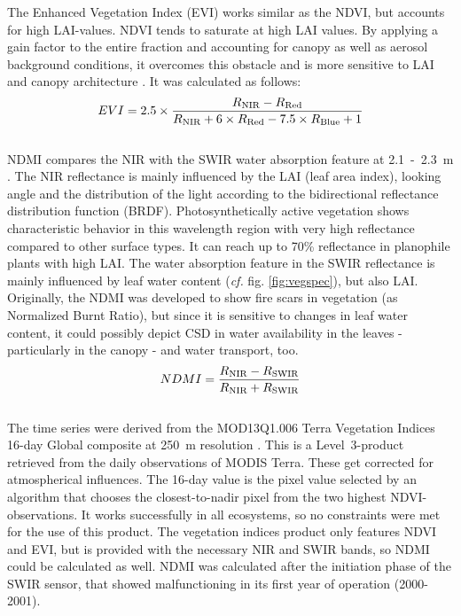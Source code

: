 The Enhanced Vegetation Index (EVI) works similar as the NDVI, but accounts for high LAI-values. NDVI tends to saturate at high LAI values. By applying a gain factor to the entire fraction and accounting for canopy as well as aerosol background conditions, it overcomes this obstacle and is more sensitive to LAI and canopy architecture \citep{liu1995}. It was calculated as follows:\\
\begin{equation}\label{eq:evi}
	EVI = 2.5 \times \frac{R\textsubscript{NIR} - R\textsubscript{Red}}{R\textsubscript{NIR} + 6 \times R\textsubscript{Red} - 7.5 \times R\textsubscript{Blue} + 1}
\end{equation}\\

NDMI compares the NIR with the SWIR water absorption feature at 2.1~-~2.3~\textmu m \citep[\textit{cf.} formula \ref{eq:nbr}, after][]{garcia1991}. The NIR reflectance is mainly influenced by the LAI (leaf area index), looking angle and the distribution of the light according to the bidirectional reflectance distribution function (BRDF). Photosynthetically active vegetation shows characteristic behavior in this wavelength region with very high reflectance compared to other surface types. It can reach up to 70\% reflectance in planophile plants with high LAI. The water absorption feature in the SWIR reflectance is mainly influenced by leaf water content (\textit{cf.} fig. \ref{fig:vegspec}), but also LAI. Originally, the NDMI was developed to show fire scars in vegetation (as Normalized Burnt Ratio), but since it is sensitive to changes in leaf water content, it could possibly depict CSD in water availability in the leaves - particularly in the canopy - and water transport, too.\\

\begin{equation}\label{eq:nbr}
	NDMI = \frac{R\textsubscript{NIR} - R\textsubscript{SWIR}}{R\textsubscript{NIR} + R\textsubscript{SWIR}} 
\end{equation}\\

The time series were derived from the MOD13Q1.006 Terra Vegetation Indices 16-day Global composite at 250~m resolution \citep{modisvcf}. This is a Level~3-product retrieved from the daily observations of MODIS Terra. These get corrected for atmospherical influences. The 16-day value is the pixel value selected by an algorithm that chooses the closest-to-nadir pixel from the two highest NDVI-observations. It works successfully in all ecosystems, so no constraints were met for the use of this product. The vegetation indices product only features NDVI and EVI, but is provided with the necessary NIR and SWIR bands, so NDMI could be calculated as well. NDMI was calculated after the initiation phase of the SWIR sensor, that showed malfunctioning in its first year of operation (2000-2001).\\

